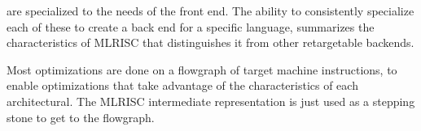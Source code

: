   are specialized to the needs of the front end. The ability to
  consistently specialize each of these to create a back end for a
  specific language, summarizes the characteristics of MLRISC that
  distinguishes it from other retargetable backends.

   Most optimizations are done on a flowgraph of
  target machine instructions, to enable optimizations that take advantage
  of the characteristics of each architectural.
  The MLRISC intermediate representation is just used as a stepping 
  stone to get to the flowgraph.
